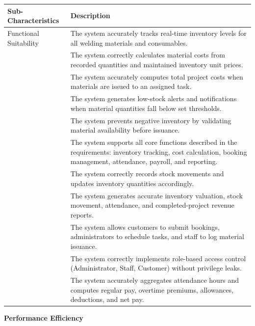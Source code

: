 \documentclass[12pt, letterpaper]{article}
\begin{document}
\begin{tabular}{p{4.3cm} p{7.5cm}}
\toprule
\textbf{Sub-Characteristics} & \textbf{Description} \\
\midrule
Functional Suitability & The system accurately tracks real-time inventory levels for all welding materials and consumables.\\
&The system correctly calculates material costs from recorded quantities and maintained inventory unit prices.\\
&The system accurately computes total project costs when materials are issued to an assigned task.\\
&The system generates low-stock alerts and notifications when material quantities fall below set thresholds.\\
&The system prevents negative inventory by validating material availability before issuance.\\
&The system supports all core functions described in the requirements: inventory tracking, cost calculation, booking management, attendance, payroll, and reporting.\\
&The system correctly records stock movements and updates inventory quantities accordingly.\\
&The system generates accurate inventory valuation, stock movement, attendance, and completed-project revenue reports.\\
&The system allows customers to submit bookings, administrators to schedule tasks, and staff to log material issuance.\\
&The system correctly implements role-based access control (Administrator, Staff, Customer) without privilege leaks.\\
&The system accurately aggregates attendance hours and computes regular pay, overtime premiums, allowances, deductions, and net pay.\\
\bottomrule
\end{tabular}

\newpage


    

\begin{center}\textbf{Performance Efficiency}\end{center}
\centering
\end{document}
